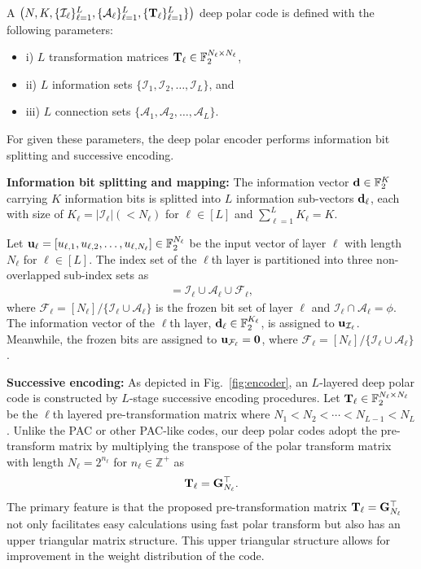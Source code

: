 \documentclass[conference]{IEEEtran}
\begin{document}
 
A  $\left(N,K, \{\mathcal{I}_{\ell}\}_{\ell=1}^L, \{\mathcal{A}_{\ell}\}_{\ell=1}^L, \{{\bf T}_{\ell}\}_{\ell=1}^L\}\right)$ deep polar code is defined with the following parameters:
\begin{itemize}
	\item  i) $L$ transformation matrices ${\bf T}_{\ell}\in \mathbb{F}_2^{N_{\ell}\times N_{\ell}}$,
	\item ii) $L$ information sets $\{\mathcal{I}_1,\mathcal{I}_2,\ldots, \mathcal{I}_{L}\}$, and
	\item iii) $L$ connection sets $\{\mathcal{A}_1,\mathcal{A}_2,\ldots, \mathcal{A}_{L}\}$.
\end{itemize}
 For given these parameters, the deep polar encoder performs  information bit splitting and successive encoding.
 
  \vspace{0.2cm}
 {\bf Information bit splitting and mapping:} 
The information vector ${\bf d} \in \mathbb{F}_2^K$ carrying $K$ information bits is splitted into $L$ information sub-vectors ${\bf d}_{\ell}$, each with size of $K_{\ell}=|\mathcal{I}_{\ell}| (<N_{\ell})$ for ${\ell}\in [L]$ and $\sum_{\ell=1}^L K_{\ell}=K$. 

 Let ${\bf u}_{\ell}=[u_{\ell,1},u_{\ell,2},\ldots, u_{\ell, N_{\ell}}]\in \mathbb{F}_2^{N_{\ell}}$ be the input vector of layer $\ell$ with length $N_{\ell}$ for $\ell\in [L]$. The index set of the $\ell$th layer is partitioned into three non-overlapped sub-index sets as
 \begin{align}
 	[N_{\ell}] =\mathcal{I}_{\ell}\cup\mathcal{A}_{\ell}\cup \mathcal{F}_{\ell},
 \end{align}
 where $\mathcal{F}_{\ell}=[N_{\ell}]/\{\mathcal{I}_{\ell}\cup \mathcal{A}_{\ell}\}$ is the frozen bit set of layer $\ell$ and $\mathcal{I}_{\ell}\cap \mathcal{A}_{\ell}=\phi$.  The information vector of the $\ell$th layer, ${\bf d}_{\ell}\in \mathbb{F}_2^{K_{\ell}}$, is assigned to ${\bf u}_{\mathcal{I}_{\ell}}$. Meanwhile, the frozen bits are assigned to ${\bf u}_{\mathcal{F}_{\ell}}={\bf 0}$, where $\mathcal{F}_{\ell}=[N_{\ell}]/\{\mathcal{I}_{\ell}\cup \mathcal{A}_{\ell}\}$. 
 
 \vspace{0.2cm}
{\bf Successive encoding:} As depicted in Fig.~\ref{fig:encoder}, an $L$-layered deep polar code is constructed by $L$-stage successive encoding procedures. Let ${\bf T}_{\ell}\in \mathbb{F}_2^{N_{\ell}\times N_{\ell}}$ be the $\ell$th layered pre-transformation matrix where $N_{1}<N_{2}<\cdots <N_{L-1}<N_L$. Unlike the PAC or other PAC-like codes, our deep polar codes adopt the pre-transform matrix by multiplying the transpose of the polar transform matrix with length $N_{\ell}=2^{n_{\ell}}$ for $n_{\ell}\in \mathbb{Z}^{+}$ as
\begin{align}
	{\bf T}_{\ell}= {\bf G}_{N_{\ell}}^{\top}.
\end{align}
The primary feature is that the proposed pre-transformation matrix ${\bf T}_{\ell}= {\bf G}_{N_{\ell}}^{\top}$ not only facilitates easy calculations using fast polar transform but also has an upper triangular matrix structure. This upper triangular structure allows for improvement in the weight distribution of the code. 
\end{document}
